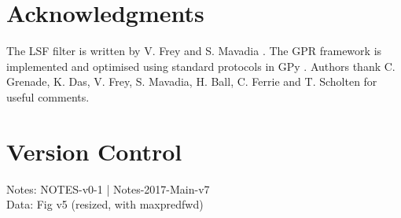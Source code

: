 \documentclass[pra, reprint]{revtex4-1}
\begin{document}
\section{Acknowledgments}
 The LSF filter is written by V. Frey and S. Mavadia \cite{mavadia2017}. The GPR framework is implemented and optimised using standard protocols in GPy \cite{gpy2014}. Authors thank C. Grenade, K. Das, V. Frey, S. Mavadia, H. Ball, C. Ferrie and T. Scholten for useful comments. 
 
\section{Version Control \label{sec:main:versioncontrol}}
Notes: NOTES-v0-1 | Notes-2017-Main-v7
\\
Data: Fig v5 (resized, with maxpredfwd)

%  


 
\end{document}
